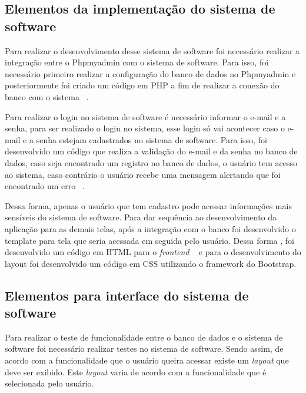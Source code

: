 \subsection{Elementos da implementação do sistema de software}

Para realizar o desenvolvimento desse sistema de software foi necessário realizar a integração entre o Phpmyadmin com o sistema de software. Para isso, foi necessário primeiro realizar a configuração do banco de dados no Phpmyadmin e posteriormente foi criado um código em PHP a fim de realizar a conexão do banco com o sistema ~.

%

Para realizar o login no sistema de software é necessário informar o e-mail e a senha, para ser realizado o login no sistema, esse login só vai acontecer caso o e-mail e a senha estejam cadastrados no sistema de software. Para isso, foi desenvolvido um código que realiza a validação do e-mail e da senha no banco de dados, caso seja encontrado um registro no banco de dados, o usuário tem acesso ao sistema, caso contrário o usuário recebe uma mensagem alertando que foi encontrado um erro ~.


%

Dessa forma, apenas o usuário que tem cadastro pode acessar informações mais sensíveis do sistema de software.
Para dar sequência ao desenvolvimento da aplicação para as demais telas, após a integração com o banco foi desenvolvido o template para tela que seria acessada em seguida pelo usuário. Dessa forma , foi desenvolvido um código em \acrfull{HTML} para o \emph{frontend} ~ e para o desenvolvimento do layout foi desenvolvido um código em \acrfull{CSS} utilizando o framework do Bootstrap.

%



\subsection{Elementos para interface do sistema de software}

Para realizar o teste de funcionalidade entre o banco de dados e o sistema de software foi necessário realizar testes no sistema de software. Sendo assim, de acordo com a funcionalidade que o usuário queira acessar existe um \emph{layout} que deve ser exibido. Este \emph{layout} varia de acordo com a funcionalidade que é selecionada pelo usuário.

